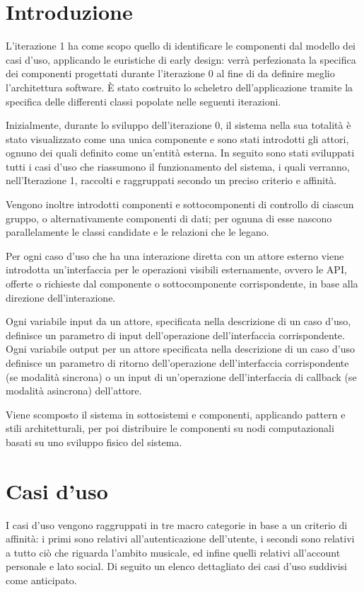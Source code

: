 \section{Introduzione}

L'iterazione 1 ha come scopo quello di identificare le componenti dal modello dei casi d'uso, 
applicando le euristiche di early design: verrà perfezionata la specifica dei componenti 
progettati durante l'iterazione 0 al fine di da definire meglio l'architettura software. 
È stato costruito lo scheletro dell'applicazione tramite la specifica delle differenti classi 
popolate nelle seguenti iterazioni.

Inizialmente, durante lo sviluppo dell'iterazione 0, il sistema nella sua totalità è stato 
visualizzato come una unica componente e sono stati 
introdotti gli attori, ognuno dei quali definito come un'entità esterna. In seguito sono stati 
sviluppati tutti i casi d'uso che riassumono il funzionamento del sistema, i quali verranno, 
nell'Iterazione 1, raccolti e raggruppati secondo un preciso criterio e affinità. 

Vengono inoltre introdotti componenti e sottocomponenti di controllo di ciascun gruppo, o 
alternativamente componenti di dati; per ognuna di esse nascono parallelamente le classi 
candidate e le relazioni che le legano. 

Per ogni caso d'uso che ha una interazione diretta con un attore esterno viene introdotta 
un'interfaccia per le operazioni visibili esternamente, ovvero le API, offerte o richieste 
dal componente o sottocomponente corrispondente, in base alla direzione dell'interazione. 

Ogni variabile input da un attore, specificata nella descrizione di un caso d'uso, 
definisce un parametro di input dell'operazione dell'interfaccia corrispondente. 
Ogni variabile output per un attore specificata nella descrizione di un caso d'uso 
definisce un parametro di ritorno dell'operazione dell'interfaccia corrispondente 
(se modalità sincrona) o un input di un'operazione dell'interfaccia di callback (se modalità asincrona) dell'attore. 

Viene scomposto il sistema in sottosistemi e componenti, applicando pattern e 
stili architetturali, per poi distribuire le componenti su nodi computazionali basati su 
uno sviluppo fisico del sistema.



\newpage

\section{Casi d'uso}
I casi d'uso vengono raggruppati in tre macro categorie in base a un criterio di affinità:
i primi sono relativi all'autenticazione dell'utente, i secondi sono relativi a tutto
ciò che riguarda l'ambito musicale, ed infine quelli relativi all'account personale e lato social. 
Di seguito un elenco dettagliato dei casi d'uso suddivisi come anticipato.

